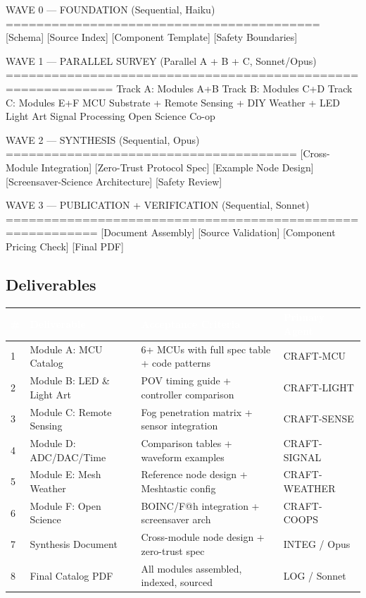 \documentclass[11pt,letterpaper]{article}
\newcommand{\tableheader}[1]{\textbf{\sffamily\textcolor{white}{#1}}}
\begin{document}
\begin{asciibox}
  WAVE 0 — FOUNDATION (Sequential, Haiku)
  =========================================
  [Schema] [Source Index] [Component Template] [Safety Boundaries]

  WAVE 1 — PARALLEL SURVEY (Parallel A + B + C, Sonnet/Opus)
  ============================================================
  Track A: Modules A+B          Track B: Modules C+D          Track C: Modules E+F
  MCU Substrate +               Remote Sensing +               DIY Weather +
  LED Light Art                 Signal Processing              Open Science Co-op

  WAVE 2 — SYNTHESIS (Sequential, Opus)
  ======================================
  [Cross-Module Integration] [Zero-Trust Protocol Spec] [Example Node Design]
  [Screensaver-Science Architecture] [Safety Review]

  WAVE 3 — PUBLICATION + VERIFICATION (Sequential, Sonnet)
  ==========================================================
  [Document Assembly] [Source Validation] [Component Pricing Check] [Final PDF]
\end{asciibox}

\subsection{Deliverables}

\begin{center}
\begin{tabularx}{\textwidth}{C{0.5cm}L{3.5cm}L{5cm}L{3.5cm}}
\toprule
{}
\tableheader{\#} & \tableheader{Deliverable} & \tableheader{Acceptance Criteria} & \tableheader{Primary Agent} \\
 & Module A: MCU Catalog & 6+ MCUs with full spec table + code patterns & CRAFT-MCU \\
2 & Module B: LED \& Light Art & POV timing guide + controller comparison & CRAFT-LIGHT \\
3 & Module C: Remote Sensing & Fog penetration matrix + sensor integration & CRAFT-SENSE \\
4 & Module D: ADC/DAC/Time & Comparison tables + waveform examples & CRAFT-SIGNAL \\
5 & Module E: Mesh Weather & Reference node design + Meshtastic config & CRAFT-WEATHER \\
6 & Module F: Open Science & BOINC/F@h integration + screensaver arch & CRAFT-COOPS \\
7 & Synthesis Document & Cross-module node design + zero-trust spec & INTEG / Opus \\
8 & Final Catalog PDF & All modules assembled, indexed, sourced & LOG / Sonnet \\
\bottomrule
\end{tabularx}
\end{center}
\end{document}
